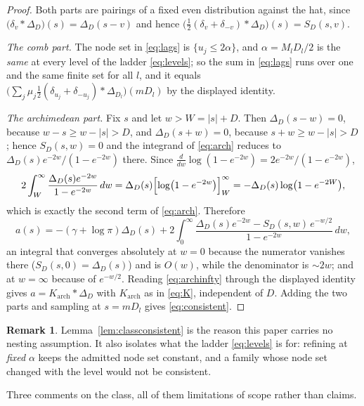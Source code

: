 \documentclass[11pt,a4paper]{article}
\theoremstyle{plain}
\theoremstyle{definition}
\newtheorem{remark}[theorem]{Remark}
\begin{document}
\begin{proof}
Both parts are pairings of a fixed even distribution against the hat, since
$\bigl(\delta_{v}*\Delta_{D}\bigr)(s)=\Delta_{D}(s-v)$ and hence
$\bigl(\tfrac12(\delta_{v}+\delta_{-v})*\Delta_{D}\bigr)(s)=S_{D}(s,v)$.

\emph{The comb part.} The node set in \eqref{eq:lags} is $\{u_{j}\le2\alpha\}$, and
$\alpha=M_{l}D_{l}/2$ is the \emph{same} at every level of the ladder
\eqref{eq:levels}; so the sum in \eqref{eq:lags} runs over one and the same finite set
for all $l$, and it equals $\bigl(\sum_{j}\mu_{j}\tfrac12(\delta_{u_{j}}
+\delta_{-u_{j}})*\Delta_{D_{l}}\bigr)(mD_{l})$ by the displayed identity.

\emph{The archimedean part.} Fix $s$ and let $w>W=|s|+D$. Then
$\Delta_{D}(s-w)=0$, because $w-s\ge w-|s|>D$, and $\Delta_{D}(s+w)=0$, because
$s+w\ge w-|s|>D$; hence $S_{D}(s,w)=0$ and the integrand of \eqref{eq:arch} reduces to
$\Delta_{D}(s)e^{-2w}/(1-e^{-2w})$ there. Since
$\frac{d}{dw}\log(1-e^{-2w})=2e^{-2w}/(1-e^{-2w})$,
\[
  2\int_{W}^{\infty}\frac{\Delta_{D}(s)e^{-2w}}{1-e^{-2w}}\,dw
  =\Delta_{D}(s)\Bigl[\log\bigl(1-e^{-2w}\bigr)\Bigr]_{W}^{\infty}
  =-\Delta_{D}(s)\log\bigl(1-e^{-2W}\bigr),
\]
which is exactly the second term of \eqref{eq:arch}. Therefore
\begin{equation}
\label{eq:archinfty}
  a(s)=-(\gamma+\log\pi)\Delta_{D}(s)
   +2\int_{0}^{\infty}
     \frac{\Delta_{D}(s)e^{-2w}-S_{D}(s,w)\,e^{-w/2}}{1-e^{-2w}}\,dw ,
\end{equation}
an integral that converges absolutely at $w=0$ because the numerator vanishes there
($S_{D}(s,0)=\Delta_{D}(s)$) and is $O(w)$, while the denominator is $\sim2w$; and at
$w=\infty$ because of $e^{-w/2}$. Reading \eqref{eq:archinfty} through the displayed
identity gives $a=K_{\mathrm{arch}}*\Delta_{D}$ with $K_{\mathrm{arch}}$ as in
\eqref{eq:K}, independent of $D$. Adding the two parts and sampling at $s=mD_{l}$
gives \eqref{eq:consistent}.
\end{proof}

\begin{remark}
\label{rem:noassumption}
Lemma~\ref{lem:classconsistent} is the reason this paper carries no nesting
assumption. It also isolates what the ladder \eqref{eq:levels} is for: refining at
\emph{fixed} $\alpha$ keeps the admitted node set constant, and a family whose node
set changed with the level would not be consistent.
\end{remark}

Three comments on the class, all of them limitations of scope rather than claims.
\end{document}

